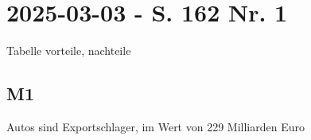 \section{2025-03-03 - S. 162 Nr. 1}

\startframedtipp
Tabelle vorteile, nachteile 
\stopframedtipp


\subsection{M1}

\startitemize[packed]
\item Autos sind Exportschlager, im Wert von 229 Milliarden Euro
\item 
\stopitemize
